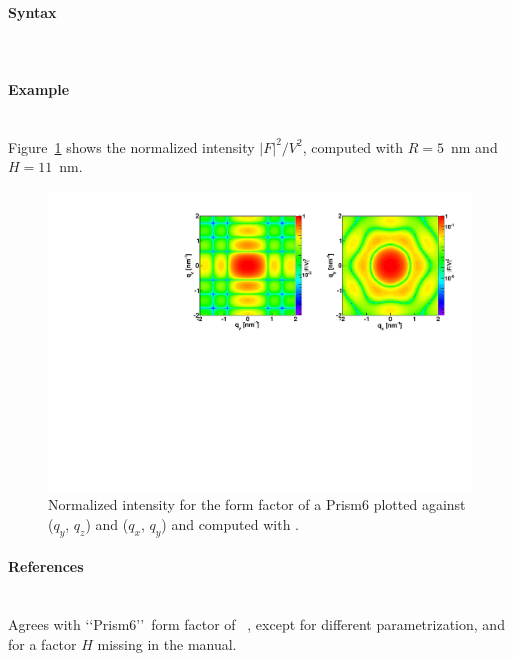 \paragraph{Syntax}\strut\\

\newpage

\paragraph{Example}\strut\\
Figure~\ref{fig:FFprism6Ex} shows the normalized intensity
$|F|^2/V^2$, computed with $R=5$~nm and \mbox{$H=11$~nm.}

\begin{figure}[ht]
\begin{center}
\includegraphics[angle=-90,width=\textwidth]{fig/ff/figffprism6.pdf}
\end{center}
\caption{Normalized intensity for the form factor of a Prism6 plotted against ($q_y$, $q_z$) and ($q_x$, $q_y$) and computed with .}
\label{fig:FFprism6Ex}
\end{figure}

\paragraph{References}\strut\\
Agrees with \lq\lq Prism6\rq\rq\ form factor of \IsGISAXS~\cite{Laz02},
except for different parametrization,
and for a factor $H$ missing in the  manual. 

